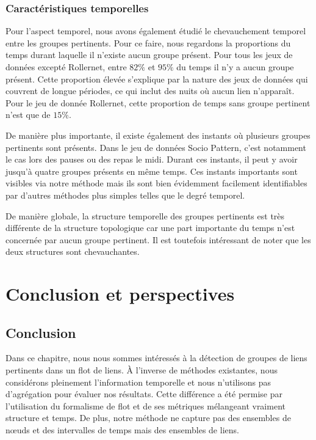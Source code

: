 \subsubsection{Caractéristiques temporelles}
Pour l'aspect temporel, nous avons également étudié le chevauchement temporel entre les groupes pertinents.
Pour ce faire, nous regardons la proportions du temps durant laquelle il n'existe aucun groupe présent.
Pour tous les jeux de données excepté Rollernet, entre $82\%$ et $95\%$ du temps il n'y a aucun groupe présent.
Cette proportion élevée s'explique par la nature des jeux de données qui couvrent de longue périodes, ce qui inclut des nuits où aucun lien n'apparaît.
Pour le jeu de donnée Rollernet, cette proportion de temps sans groupe pertinent n'est que de $15\%$.

De manière plus importante, il existe également des instants où plusieurs groupes pertinents sont présents.
Dans le jeu de données Socio Pattern, c'est notamment le cas lors des pauses ou des repas le midi.
Durant ces instants, il peut y avoir jusqu'à quatre groupes présents en même temps.
Ces instants importants sont visibles via notre méthode mais ils sont bien évidemment facilement identifiables par d'autres méthodes plus simples telles que le degré temporel.

De manière globale, la structure temporelle des groupes pertinents est très différente de la structure topologique car une part importante du temps n'est concernée par aucun groupe pertinent.
Il est toutefois intéressant de noter que les deux structures sont chevauchantes. 



\section{Conclusion et perspectives}
\subsection{Conclusion}

Dans ce chapitre, nous nous sommes intéressés à la détection de groupes de liens pertinents dans un flot de liens.
\`A l'inverse de méthodes existantes, nous considérons pleinement l'information temporelle et nous n'utilisons pas d'agrégation pour évaluer nos résultats.
Cette différence a été permise par l'utilisation du formalisme de flot et de ses métriques mélangeant vraiment structure et temps.
De plus, notre méthode ne capture pas des ensembles de n\oe{}uds et des intervalles de temps mais des ensembles de liens.

